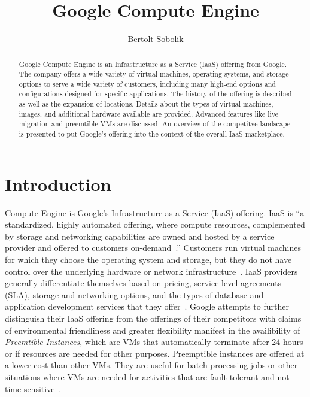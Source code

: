 
\title{Google Compute Engine}


\author{Bertolt Sobolik}

\renewcommand{\shortauthors}{B. Sobolik}


\begin{abstract}
Google Compute Engine is an Infrastructure as a Service (IaaS)
offering from Google. The company offers a wide variety of virtual
machines, operating systems, and storage options to serve a wide
variety of customers, including many high-end options and
configurations designed for specific applications. The history of the
offering is described as well as the expansion of locations. Details
about the types of virtual machines, images, and additional hardware
available are provided. Advanced features like live migration and
preemtible VMs are discussed. An overview of the competitve landscape
is presented to put Google's offering into the context of the overall
IaaS marketplace.
\end{abstract}



\maketitle

\section{Introduction}
Compute Engine is Google's Infrastructure as a Service (IaaS)
offering. IaaS is ``a standardized, highly automated offering, where
compute resources, complemented by storage and networking capabilities
are owned and hosted by a service provider and offered to customers
on-demand~\cite{hid-sp18-419-gartneritglossaryiaas}.''  Customers run
virtual machines for which they choose the operating system and
storage, but they do not have control over the underlying hardware or
network infrastructure~\cite{hid-sp18-419-mell2011nist}. IaaS
providers generally differentiate themselves based on pricing, service
level agreements (SLA), storage and networking options, and the types
of database and application development services that they
offer~\cite{hid-sp18-419-perficientchoosingiaas}. Google attempts to
further distinguish their IaaS offering from the offerings of their
competitors with claims of environmental friendliness and greater
flexibility manifest in the availibility of \textit{Preemtible
Instances}, which are VMs that automatically terminate after 24 hours
or if resources are needed for other purposes. Preemptible instances
are offered at a lower cost than other VMs. They are useful for batch
processing jobs or other situations where VMs are needed for
activities that are fault-tolerant and not time
sensitive~\cite{hid-sp18-419-gce}.


